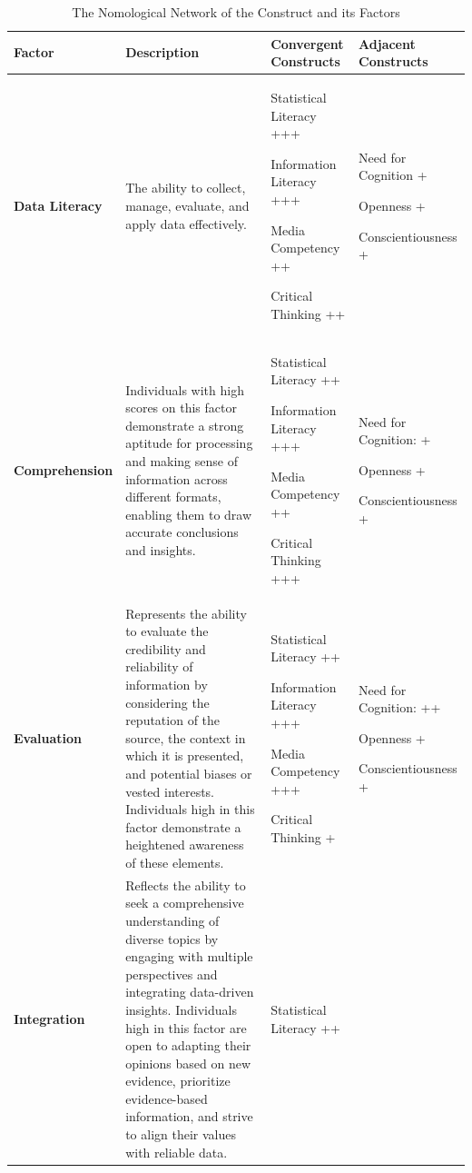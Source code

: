 \documentclass[
  12pt,
  a4paper,
  twoside]{article}
\begin{document}
\begin{table}[!htbp]
\centering
\caption{The Nomological Network of the Construct and its Factors}
\scriptsize
\begin{tabular}{|p{}|p{}|p{}|p{}|}
\hline
\textbf{Factor} & \textbf{Description} & \textbf{Convergent Constructs} & \textbf{Adjacent Constructs} \\
\hline
\textbf{Data Literacy} & The ability to collect, manage, evaluate, and apply data effectively. & Statistical Literacy +++

Information Literacy +++

Media Competency ++

Critical Thinking ++
& Need for Cognition +

Openness +

Conscientiousness + \\
\hline
\textbf{Comprehension} & Individuals with high scores on this factor demonstrate a strong aptitude for processing and making sense of information across different formats, enabling them to draw accurate conclusions and insights. & Statistical Literacy ++

Information Literacy +++

Media Competency ++

Critical Thinking +++
& Need for Cognition: +

Openness +

Conscientiousness +\\
\hline
\textbf{Evaluation} & Represents the ability to evaluate the credibility and reliability of information by considering the reputation of the source, the context in which it is presented, and potential biases or vested interests. Individuals high in this factor demonstrate a heightened awareness of these elements. & Statistical Literacy ++

Information Literacy +++

Media Competency +++

Critical Thinking +
& Need for Cognition: ++ 

Openness +

Conscientiousness +\\
\hline
\textbf{Integration} & Reflects the ability to seek a comprehensive understanding of diverse topics by engaging with multiple perspectives and integrating data-driven insights. Individuals high in this factor are open to adapting their opinions based on new evidence, prioritize evidence-based information, and strive to align their values with reliable data. & Statistical Literacy ++


\end{tabular}
\end{table}
\end{document}
